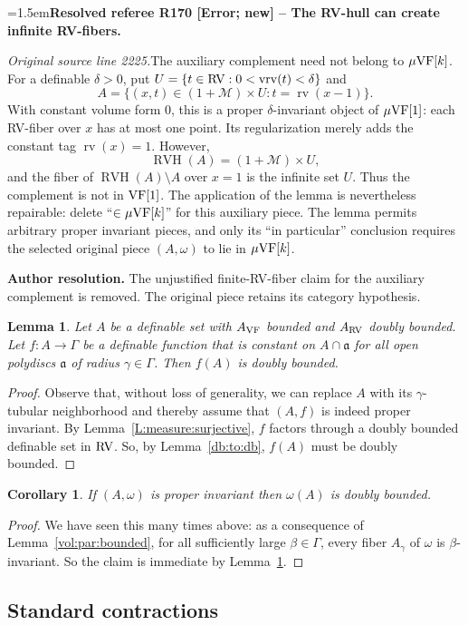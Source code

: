 \documentclass[12pt]{amsart}
\newcommand{\ResolvedRefereeRemark}[5]{%
  \par\medskip\begingroup\normalfont\small\color{gray}%
  \emergencystretch=1.5em\noindent\textbf{Resolved referee R#1 [#2] -- #3.}\par\nobreak\noindent #4\par
  \medskip\color{ResolutionGreen}\noindent\textbf{Author resolution.} #5\par
  \endgroup\medskip
}
\theoremstyle{plain}
\newtheorem{cor}[thm]{Corollary}
\newtheorem{lem}[thm]{Lemma}
\theoremstyle{definition}
\theoremstyle{remark}
\numberwithin{equation}{section}
\theoremstyle{plain}
\newcommand{\VF}{\textup{VF}}
\newcommand{\RV}{\textup{RV}}
\newcommand{\MM}{\mdl M}
\newcommand{\ga}{\mathfrak{a}}
\newcommand{\0}{\emptyset}
\newcommand{\mdl}[1]{\mathcal{#1}}  %
\newcommand{\fun}{\longrightarrow}
\newcommand{\mVF}{{\mu}{\VF}}
\DeclareMathOperator{\rv}{rv}
\DeclareMathOperator{\vrv}{vrv}
\DeclareMathOperator{\RVH}{RVH}
\begin{document}
\ResolvedRefereeRemark{170}{Error; new}{The RV-hull can create infinite RV-fibers}{%
\textit{Original source line 2225.}\quad The auxiliary complement need not belong to $\mVF[k]$. For a definable $\delta>0$, put $U=\{t\in\RV:0<\vrv(t)<\delta\}$ and
\[
 A=\{(x,t)\in(1+\MM)\times U:t=\rv(x-1)\}.
\]
With constant volume form $0$, this is a proper $\delta$-invariant object of $\mVF[1]$: each RV-fiber over $x$ has at most one point. Its regularization merely adds the constant tag $\rv(x)=1$. However,
\[
 \RVH(A)=(1+\MM)\times U,
\]
and the fiber of $\RVH(A)\setminus A$ over $x=1$ is the infinite set $U$. Thus the complement is not in $\VF[1]$. The application of the lemma is nevertheless repairable: delete ``$\in\mVF[k]$'' for this auxiliary piece. The lemma permits arbitrary proper invariant pieces, and only its ``in particular'' conclusion requires the selected original piece $(A,\omega)$ to lie in $\mVF[k]$.
}{The unjustified finite-RV-fiber claim for the auxiliary complement is removed. The original piece retains its category hypothesis.}


\begin{lem}\label{invar:db}
Let $A$ be a definable set with $A_{\VF}$  bounded and $A_{\RV}$  doubly bounded. Let $f : A \fun \Gamma$ be a definable function  that is constant on $A \cap \ga$ for all open polydiscs $\ga$ of radius $\gamma \in \Gamma$. Then $f(A)$ is doubly bounded.
\end{lem}
\begin{proof}
Observe that, without loss of generality, we can replace $A$ with its $\gamma$-tubular neighborhood and thereby  assume that $(A,f)$ is indeed proper invariant. By Lemma~\ref{L:measure:surjective}, $f$ factors through a doubly bounded definable set in $\RV$. So, by Lemma~\ref{db:to:db},  $f(A)$ must be doubly bounded.
\end{proof}

\begin{cor}
If $(A, \omega)$ is proper invariant then $\omega(A)$ is doubly bounded.
\end{cor}
\begin{proof}
We have seen this many times above: as a consequence of Lemma~\ref{vol:par:bounded}, for all sufficiently large $\beta \in \Gamma$, every fiber $A_\gamma$ of $\omega$ is $\beta$-invariant. So the claim is immediate by Lemma~\ref{invar:db}.
\end{proof}

\subsection{Standard contractions}
\end{document}
